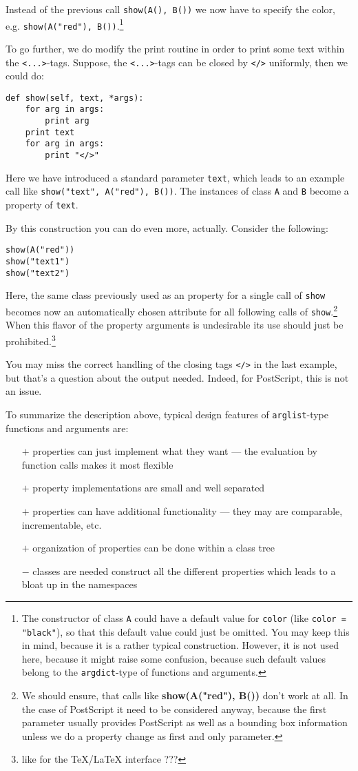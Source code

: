 \documentclass{article}
\begin{document}
Instead of the previous call \verb|show(A(), B())| we now have
to specify the color, e.g.
\verb|show(A("red"), B())|.\footnote{The constructor of class
\texttt{A} could have a default value for \texttt{color} (like
\texttt{color = "black"}), so that this default value could just be
omitted. You may keep this in mind, because it is a rather typical
construction. However, it is not used here, because it might raise
some confusion, because such default values belong to the
\texttt{argdict}-type of functions and arguments.}

To go further, we do modify the print routine in order to print some
text within the \verb|<...>|-tags. Suppose, the \verb|<...>|-tags can
be closed by \verb|</>| uniformly, then we could do:
\begin{verbatim}
def show(self, text, *args):
    for arg in args:
        print arg
    print text
    for arg in args:
        print "</>"
\end{verbatim}

Here we have introduced a standard parameter \verb|text|, which leads
to an example call like \verb|show("text", A("red"), B())|. The
instances of class \verb|A| and \verb|B| become a property of
\verb|text|.

By this construction you can do even more, actually.
Consider the following:
\begin{verbatim}
show(A("red"))
show("text1")
show("text2")
\end{verbatim}

Here, the same class previously used as an property for a single
call of \verb|show| becomes now an automatically chosen attribute for
all following calls of \verb|show|.\footnote{We should ensure, that
calls like \textbf{show(A("red"), B())} don't work at all. In the case
of PostScript it need to be considered anyway, because the first
parameter usually provides PostScript as well as a bounding box
information unless we do a property change as first and only
parameter.} When this flavor of the property arguments is undesirable
its use should just be prohibited.\footnote{like for the \TeX/\LaTeX{}
interface ???}

You may miss the correct handling of the closing tags \verb|</>| in
the last example, but that's a question about the output needed.
Indeed, for PostScript, this is not an issue.

To summarize the description above, typical design features of
\verb|arglist|-type functions and arguments are:
\begin{itemize}
\item[$+$]
properties can just implement what they want --- the evaluation by
function calls makes it most flexible
\item[$+$]
property implementations are small and well separated
\item[$+$]
properties can have additional functionality --- they may are
comparable, incrementable, etc.
\item[$+$]
organization of properties can be done within a class tree
\item[$-$]
classes are needed construct all the different properties which leads
to a bloat up in the namespaces
\end{itemize}
\end{document}

